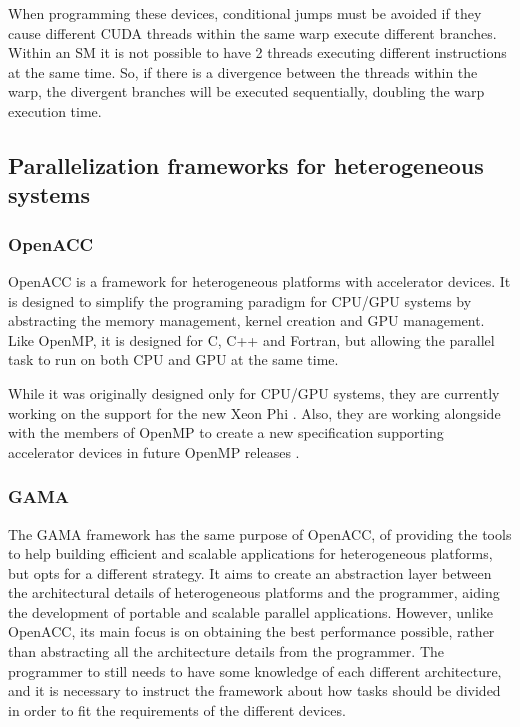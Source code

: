 When programming these devices, conditional jumps must be avoided if they cause different CUDA threads within the same warp execute different branches. Within an SM it is not possible to have 2 threads executing different instructions at the same time. So, if there is a divergence between the threads within the warp, the divergent branches will be executed sequentially, doubling the warp execution time.

\subsection{Parallelization frameworks for heterogeneous systems}
\label{HeterogeneousFrameworks}

\subsubsection*{OpenACC}
\label{OpenACC}

OpenACC \cite{OpenACC} is a framework for heterogeneous platforms with accelerator devices. It is designed to simplify the programing paradigm for CPU/GPU systems by abstracting the memory management, kernel creation and GPU management. Like OpenMP, it is designed for C, C++ and Fortran, but allowing the parallel task to run on both CPU and GPU at the same time.

While it was originally designed only for CPU/GPU systems, they are currently working on the support for the new \intel Xeon Phi \cite{OpenACC:HPCWire}. Also, they are working alongside with the members of OpenMP to create a new specification supporting accelerator devices in future OpenMP releases \cite{OpenACC:OpenMP}.

\subsubsection*{GAMA}
\label{GAMA}

The GAMA framework \cite{GAMA} has the same purpose of OpenACC, of providing the tools to help building efficient and scalable applications for heterogeneous platforms, but opts for a different strategy. It aims to create an abstraction layer between the architectural details of heterogeneous platforms and the programmer, aiding the development of portable and scalable parallel applications. However, unlike OpenACC, its main focus is on obtaining the best performance possible, rather than abstracting all the architecture details from the programmer. The programmer to still needs to have some knowledge of each different architecture, and it is necessary to instruct the framework about how tasks should be divided in order to fit the requirements of the different devices.

